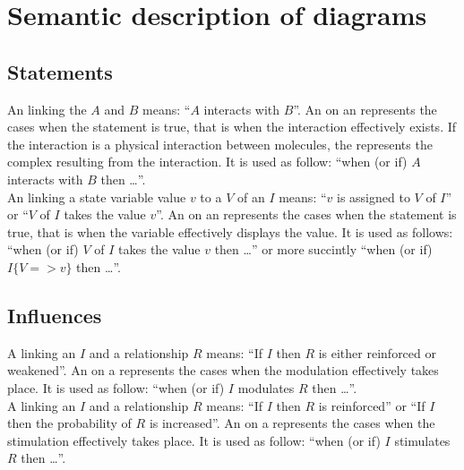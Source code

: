 \color{red}
\section{Semantic description of \ER{} diagrams}


\subsection{Statements}

An  linking the  $A$ and $B$ means: ``$A$ interacts with $B$''. An  on an  represents the cases when the statement is true, that is when the interaction effectively exists. If the interaction is a physical interaction between molecules, the  represents the complex resulting from the interaction. It is used as follow: ``when (or if) $A$ interacts with $B$ then \ldots''.\\[\baselineskip]

\noindent
An  linking a state variable value $v$ to a  $V$ of an  $I$ means: ``$v$ is assigned to $V$ of $I$'' or ``$V$ of $I$ takes the value $v$''. An on an  represents the cases when the statement is true, that is when the variable effectively displays the value. It is used as follows: ``when (or if) $V$ of $I$ takes the value $v$ then \ldots'' or more succintly ``when (or if) $I\{V => v\}$ then \ldots''.\\[\baselineskip]

\subsection{Influences}

A  linking an  $I$ and a relationship $R$ means: ``If $I$ then $R$ is either reinforced or weakened''. An  on a  represents the cases when the modulation effectively takes place. It is used as follow: ``when (or if) $I$ modulates $R$ then \ldots''.\\[\baselineskip]


\noindent
A  linking an  $I$ and a relationship $R$ means: ``If $I$ then $R$ is reinforced'' or ``If $I$ then the probability of $R$ is increased''. An  on a  represents the cases when the stimulation effectively takes place. It is used as follow: ``when (or if) $I$ stimulates $R$ then \ldots''.\\[\baselineskip]

